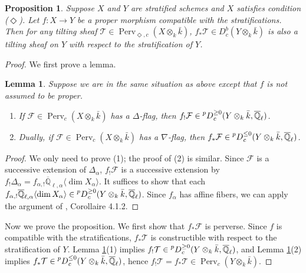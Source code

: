 \documentclass{amsart}
\theoremstyle{plain}
\newtheorem{lemma}[subsubsection]{Lemma}
\newtheorem{prop}[subsubsection]{Proposition}
\theoremstyle{definition}
\theoremstyle{remark}
\numberwithin{equation}{subsection}
\begin{document}
\begin{prop}\label{p:push}
Suppose $X$ and $Y$ are stratified schemes and $X$ satisfies condition ($\Diamond$). Let $f:X\to Y$ be a proper morphism compatible with the stratifications. Then for any tilting sheaf ${\mathcal{T}}\in{\operatorname{Perv}_{\Diamond,c}({{{X}}\otimes_k\bar{k}})}$, $f_*{\mathcal{T}}\in{D^b_c({{{Y}}\otimes_k\bar{k}})}$ is also a tilting sheaf on $Y$ with respect to the stratification of $Y$. 
\end{prop}
\begin{proof}
We first prove a lemma.
\begin{lemma}\label{l:push} 
Suppose we are in the same situation as above except that $f$ is not assumed to be proper.
\begin{enumerate}[(1)]
\item If ${\mathcal{F}}\in{\operatorname{Perv}_c({{{X}}\otimes_k\bar{k}})}$ has a $\Delta$-flag, then $f_!{\mathcal{F}}\in{{\vphantom{{D}}}^{{p}}{{D}}}^{\geq0}_c({{Y}\otimes_k\bar{k}},{\overline{\mathbb{Q}}_{\ell}})$.
\item Dually, if ${\mathcal{F}}\in{\operatorname{Perv}_c({{{X}}\otimes_k\bar{k}})}$ has a $\nabla$-flag, then $f_*{\mathcal{F}}\in{{\vphantom{{D}}}^{{p}}{{D}}}^{\leq0}_c({{Y}\otimes_k\bar{k}},{\overline{\mathbb{Q}}_{\ell}})$.
\end{enumerate}
\end{lemma}
\begin{proof}
We only need to prove (1); the proof of (2) is similar. Since ${\mathcal{F}}$ is a successive extension of $\Delta_\alpha$, $f_!{\mathcal{F}}$ is a successive extension by $f_!\Delta_\alpha=f_{\alpha,!}{\overline{\mathbb{Q}}_{\ell,\alpha}{\langle{{\dim X_\alpha}}\rangle}}$. It suffices to show that each $f_{\alpha,!}{\overline{\mathbb{Q}}_{\ell,\alpha}{\langle{{\dim X_\alpha}}\rangle}}\in{{\vphantom{{D}}}^{{p}}{{D}}}^{\geq0}_c({{Y}\otimes_k\bar{k}},{\overline{\mathbb{Q}}_{\ell}})$. Since $f_{\alpha}$ has affine fibers, we can apply the argument of \cite{BBD}, Corollaire 4.1.2. 
\end{proof}

Now we prove the proposition. We first show that $f_*{\mathcal{F}}$ is perverse. Since $f$ is compatible with the stratifications, $f_*{\mathcal{T}}$ is constructible with respect to the stratification of $Y$. Lemma \ref{l:push}(1) implies $f_!{\mathcal{T}}\in{{\vphantom{{D}}}^{{p}}{{D}}}^{\geq0}_c({{Y}\otimes_k\bar{k}},{\overline{\mathbb{Q}}_{\ell}})$, and Lemma \ref{l:push}(2) implies $f_*{\mathcal{T}}\in{{\vphantom{{D}}}^{{p}}{{D}}}^{\leq0}_c({{Y}\otimes_k\bar{k}},{\overline{\mathbb{Q}}_{\ell}})$, hence $f_!{\mathcal{T}}=f_*{\mathcal{T}}\in{\operatorname{Perv}_c({{{Y}}\otimes_k\bar{k}})}$.


\end{proof}
\end{document}
